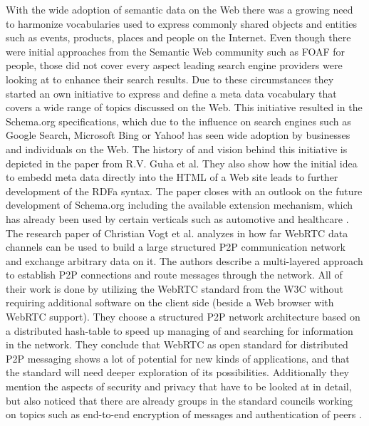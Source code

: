 With the wide adoption of semantic data on the Web there was a growing need to harmonize vocabularies used to express commonly shared objects and entities such as events, products, places and people on the Internet. Even though there were initial approaches from the Semantic Web community such as \gls{FOAF} for people, those did not cover every aspect leading search engine providers were looking at to enhance their search results. Due to these circumstances they started an own initiative to express and define a meta data vocabulary that covers a wide range of topics discussed on the Web. This initiative resulted in the Schema.org specifications, which due to the influence on search engines such as Google Search, Microsoft Bing or Yahoo! has seen wide adoption by businesses and individuals on the Web. The history of and vision behind this initiative is depicted in the paper from R.V. Guha et al. They also show how the initial idea to embedd meta data directly into the \gls{HTML} of a Web site leads to further development of the \gls{RDFa} syntax. The paper closes with an outlook on the future development of Schema.org including the available extension mechanism, which has already been used by certain verticals such as automotive and healthcare \citep{guha2016schema}. \\

The research paper of Christian Vogt et al. analyzes in how far \gls{WebRTC} data channels can be used to build a large structured \gls{P2P} communication network and exchange arbitrary data on it. The authors describe a multi-layered approach to establish \gls{P2P} connections and route messages through the network. All of their work is done by utilizing the \gls{WebRTC} standard from the \gls{W3C} without requiring additional software on the client side (beside a Web browser with \gls{WebRTC} support). They choose a structured \gls{P2P} network architecture based on a distributed hash-table to speed up managing of and searching for information in the network. They conclude that \gls{WebRTC} as open standard for distributed \gls{P2P} messaging shows a lot of potential for new kinds of applications, and that the standard will need deeper exploration of its possibilities. Additionally they mention the aspects of security and privacy that have to be looked at in detail, but also noticed that there are already groups in the standard councils working on topics such as end-to-end encryption of messages and authentication of peers \citep{vogt2013leveraging}. \\

